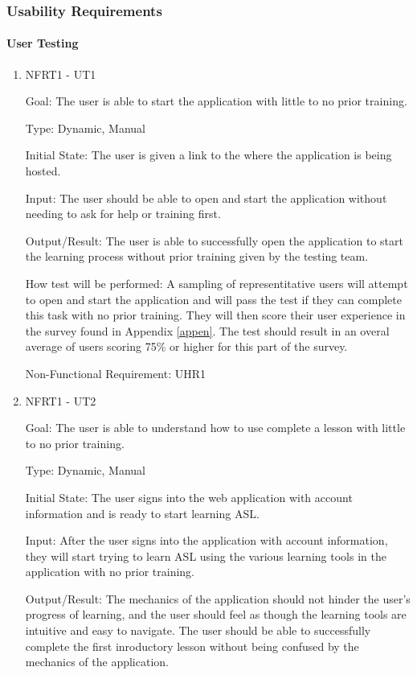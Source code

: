 \documentclass[12pt, titlepage]{article}
\begin{document}
\subsubsection{Usability Requirements}
		
\paragraph{User Testing}

\begin{enumerate}

\item{NFRT1 - UT1}

Goal: The user is able to start the application with little to no prior training. 

Type: Dynamic, Manual
					
Initial State: The user is given a link to the where the application is being hosted. 
					
Input: The user should be able to open and start the application without needing to ask for help or training first. 
					
Output/Result: The user is able to successfully open the application to start the learning process without prior training given by the testing team. 
					
How test will be performed: A sampling of representitative users will attempt to open and start the application and will pass the test if they can complete this task with no prior training. They will then score their user experience in the survey found in Appendix \ref{appen}. The test should result in an overal average of users scoring 75\% or higher for this part of the survey. 

Non-Functional Requirement: UHR1

\item{NFRT1 - UT2}

Goal: The user is able to understand how to use complete a lesson with little to no prior training.

Type: Dynamic, Manual
					
Initial State: The user signs into the web application with account information and is ready to start learning ASL.
					
Input: After the user signs into the application with account information, they will start trying to learn ASL using the various learning tools in the application with no prior training.  
					
Output/Result: The mechanics of the application should not hinder the user's progress of learning, and the user should feel as though the learning tools are intuitive and easy to navigate. The user should be able to successfully complete the first inroductory lesson without being confused by the mechanics of the application. 
					

\end{enumerate}
\end{document}
